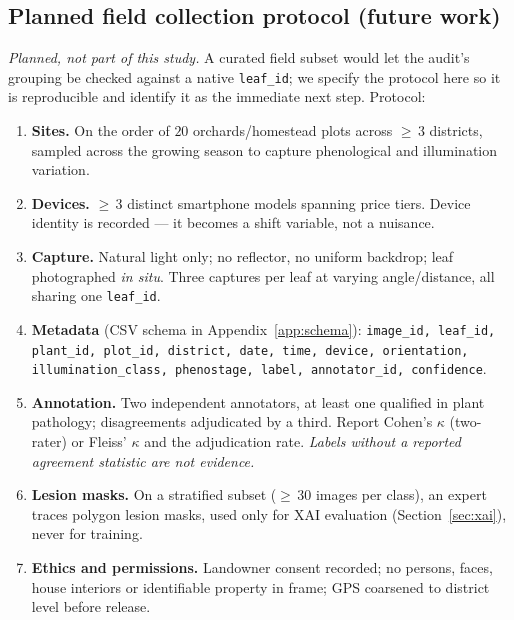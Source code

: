 \documentclass[10pt,twocolumn,a4paper]{article}
\begin{document}
\subsection{Planned field collection protocol (future work)}
\label{sec:fieldproto}
\emph{Planned, not part of this study.} A curated field subset would let the audit's grouping be checked against a native \texttt{leaf\_id}; we specify the protocol here so it is reproducible and identify it as the immediate next step. Protocol:

\begin{enumerate}[leftmargin=1.3em,itemsep=1.5pt,topsep=2pt]
\item \textbf{Sites.} On the order of $20$ orchards/homestead plots across $\geq$\,3 districts, sampled across the growing season to capture phenological and illumination variation.
\item \textbf{Devices.} $\geq$\,3 distinct smartphone models spanning price tiers. Device identity is recorded --- it becomes a shift variable, not a nuisance.
\item \textbf{Capture.} Natural light only; no reflector, no uniform backdrop; leaf photographed \emph{in situ}. Three captures per leaf at varying angle/distance, all sharing one \texttt{leaf\_id}.
\item \textbf{Metadata} (CSV schema in Appendix~\ref{app:schema}): \texttt{image\_id, leaf\_id, plant\_id, plot\_id, district, date, time, device, orientation, illumination\_class, phenostage, label, annotator\_id, confidence}.
\item \textbf{Annotation.} Two independent annotators, at least one qualified in plant pathology; disagreements adjudicated by a third. Report Cohen's $\kappa$ (two-rater) or Fleiss' $\kappa$ and the adjudication rate. \emph{Labels without a reported agreement statistic are not evidence.}
\item \textbf{Lesion masks.} On a stratified subset ($\geq$\,30 images per class), an expert traces polygon lesion masks, used only for XAI evaluation (Section~\ref{sec:xai}), never for training.
\item \textbf{Ethics and permissions.} Landowner consent recorded; no persons, faces, house interiors or identifiable property in frame; GPS coarsened to district level before release.
\end{enumerate}
\end{document}
